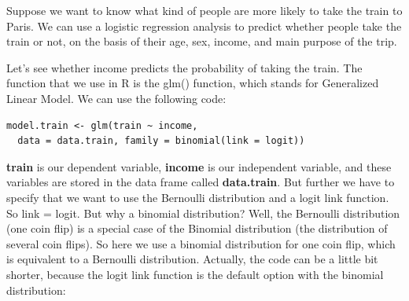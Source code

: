 \documentclass[]{book}\usepackage[]{graphicx}\usepackage[]{color}
\begin{document}
% 


Suppose we want to know what kind of people are more likely to take the train to Paris. We can use a logistic regression analysis to predict whether people take the train or not, on the basis of their age, sex, income, and main purpose of the trip.

Let's see whether income predicts the probability of taking the train. The function that we use in R is the glm() function, which stands for Generalized Linear Model. We can use the following code:



\begin{lstlisting}
model.train <- glm(train ~ income, 
  data = data.train, family = binomial(link = logit))
\end{lstlisting}

\textbf{train} is our dependent variable, \textbf{income} is our independent variable, and these variables are stored in the data frame called \textbf{data.train}. But further we have to specify that we want to use the Bernoulli distribution and a logit link function. So link = logit. But why a binomial distribution? Well, the Bernoulli distribution (one coin flip) is a special case of the Binomial distribution (the distribution of several coin flips). So here we use a binomial distribution for one coin flip, which is equivalent to a Bernoulli distribution. Actually, the code can be a little bit shorter, because the logit link function is the default option with the binomial distribution:
\end{document}
